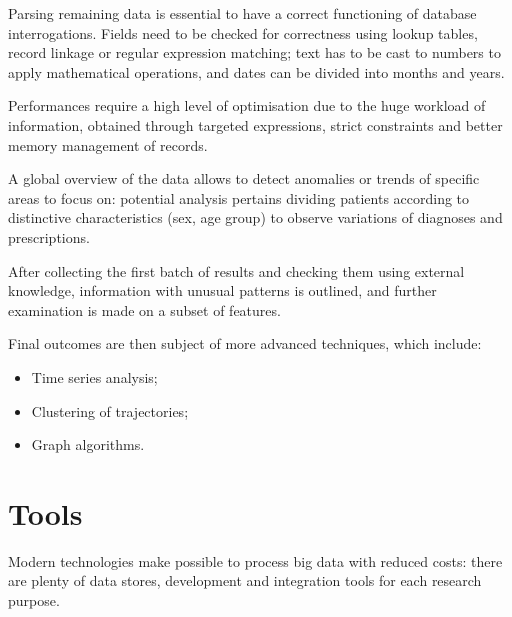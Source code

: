 Parsing remaining data is essential to have a correct functioning of database interrogations. Fields need to be checked for correctness using lookup tables, record linkage or regular expression matching; text has to be cast to numbers to apply mathematical operations, and dates can be divided into months and years.

Performances require a high level of optimisation due to the huge workload of information, obtained through targeted expressions, strict constraints and better memory management of records. 

A global overview of the data allows to detect anomalies or trends of specific areas to focus on: potential analysis pertains dividing patients according to distinctive characteristics (sex, age group) to observe variations of diagnoses and prescriptions. 

After collecting the first batch of results and checking them using external knowledge, information with unusual patterns is outlined, and further examination is made on a subset of features.

Final outcomes are then subject of more advanced techniques, which include:
\begin{itemize}
	\item Time series analysis;
	\item Clustering of trajectories;
	\item Graph algorithms.
\end{itemize}

\section{Tools}
Modern technologies make possible to process big data with reduced costs: there are plenty of data stores, development and integration tools for each research purpose. 

